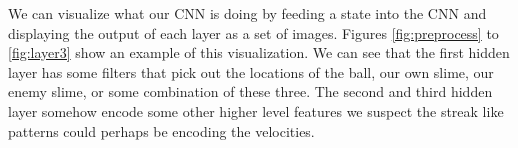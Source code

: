 \documentclass[10pt,twocolumn,letterpaper]{article}
\begin{document}
We can visualize what our CNN is doing by feeding a state into the CNN and
displaying the output of each layer as a set of images. Figures \ref{fig:preprocess}
to \ref{fig:layer3} show an example of this visualization. We can see that
the first hidden layer has some filters that pick out the locations of the ball,
our own slime, our enemy slime, or some combination of these three. The second
and third hidden layer somehow encode some other higher level features we
suspect the streak like patterns could perhaps be encoding the velocities.

{\small


}
\end{document}
